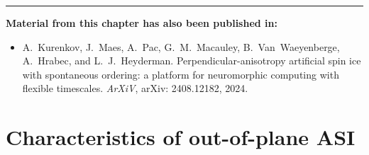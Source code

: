 \begin{adjustwidth}{2em}{2em} %
	\vspace{1em}
	\begin{center}
		\centering\rule{0.7\linewidth}{0.4pt}
	\end{center}
	\vspace{.5em}
	\begin{center}
		\textbf{Material from this chapter has also been published in:} \\
	\end{center}
	\vspace{0em} %
	\begin{adjustwidth}{0em}{1.5em}
		\begin{itemize}
			\item[\cite{KUR-24}] A.~Kurenkov, J.~Maes, A.~Pac, G.~M.~Macauley, B.~Van~Waeyenberge, A.~Hrabec, and L.~J.~Heyderman.
			\newblock Perpendicular-anisotropy artificial spin ice with spontaneous ordering: a platform for neuromorphic computing with flexible timescales.
			\newblock \emph{ArXiV}, arXiv: 2408.12182, 2024.
		\end{itemize}
	\end{adjustwidth}
\end{adjustwidth}

\section{Characteristics of out-of-plane ASI}
